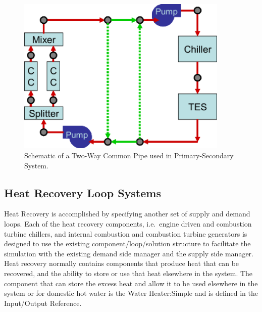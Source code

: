 \begin{figure}[hbtp] %
\centering
\includegraphics[width=0.9\textwidth, height=0.9\textheight, keepaspectratio=true]{media/image1976.svg.png}
\caption{Schematic of a Two-Way Common Pipe used in Primary-Secondary System. \protect \label{fig:schematic-of-a-two-way-common-pipe-used-in}}
\end{figure}

\subsection{Heat Recovery Loop Systems}\label{heat-recovery-loop-systems}

Heat Recovery is accomplished by specifying another set of supply and demand loops. Each of the heat recovery components, i.e.~engine driven and combustion turbine chillers, and internal combustion and combustion turbine generators is designed to use the existing component/loop/solution structure to facilitate the simulation with the existing demand side manager and the supply side manager. Heat recovery normally contains components that produce heat that can be recovered, and the ability to store or use that heat elsewhere in the system. The component that can store the excess heat and allow it to be used elsewhere in the system or for domestic hot water is the Water Heater:Simple and is defined in the Input/Output Reference.

